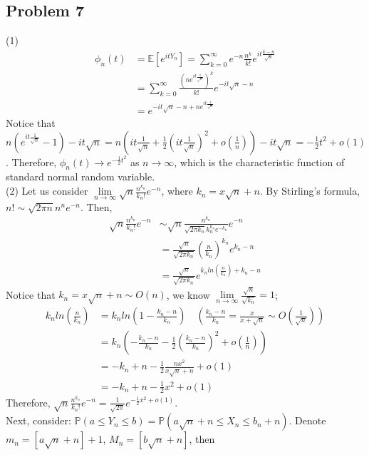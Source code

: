 \documentclass[12pt]{article}
\begin{document}
\subsection*{Problem 7}
(1)
\begin{align*}
\phi_{n}(t)&=\mathbb{E}[e^{itY_{n}}]=\sum_{k=0}^{\infty}e^{-n}\frac{n^k}{k!}e^{it\frac{k-n}{\sqrt{n}}}\\
&=\sum_{k=0}^{\infty}\frac{(ne^{it\frac{1}{\sqrt{n}}})^{k}}{k!}e^{-it\sqrt{n}-n}\\
&=e^{-it\sqrt{n}-n+ne^{it\frac{1}{\sqrt{n}}}}
\end{align*}
Notice that $n(e^{it\frac{1}{\sqrt{n}}}-1)-it\sqrt{n}=n(it\frac{1}{\sqrt{n}}+\frac{1}{2}(it\frac{1}{\sqrt{n}})^2+o(\frac{1}{n}))-it\sqrt{n}=-\frac{1}{2}t^2+o(1)$. Therefore, $\phi_{n}(t)\rightarrow e^{-\frac{1}{2}t^2}$ as $n\rightarrow\infty$, which is the characteristic function of standard normal random variable.\\
(2) Let us consider $\lim\limits_{n\rightarrow\infty}\sqrt{n}\frac{n^{k_{n}}}{k_{n}!}e^{-n}$, where $k_{n}=x\sqrt{n}+n$. By Stirling's formula, $n!\sim\sqrt{2\pi n}n^{n}e^{-n}$. Then,
\begin{align*}
\sqrt{n}\frac{n^{k_{n}}}{k_{n}!}e^{-n} &\sim \sqrt{n}\frac{n^{k_{n}}}{\sqrt{2\pi k_{n}}k_{n}^{k_{n}}e^{-k_{n}}} e^{-n}\\
&=\frac{\sqrt{n}}{\sqrt{2\pi k_{n}}}(\frac{n}{k_{n}})^{k_{n}}e^{k_{n}-n}\\
&=\frac{\sqrt{n}}{\sqrt{2\pi k_{n}}}e^{k_{n}ln(\frac{n}{k_{n}})+k_{n}-n}
\end{align*}
Notice that $k_{n}=x\sqrt{n}+n\sim O(n)$, we know $\lim\limits_{n\rightarrow\infty}\frac{\sqrt{n}}{\sqrt{k_{n}}}=1$;
\begin{align*}
k_{n}ln(\frac{n}{k_{n}})&=k_{n}ln(1-\frac{k_{n}-n}{k_{n}})\quad(\frac{k_{n}-n}{k_{n}}=\frac{x}{x+\sqrt{n}}\sim O(\frac{1}{\sqrt{n}}))\\
&=k_{n}(-\frac{k_{n}-n}{k_{n}}-\frac{1}{2}(\frac{k_{n}-n}{k_{n}})^{2}+o(\frac{1}{n}))\\
&=-k_{n}+n-\frac{1}{2}\frac{n x^2}{x\sqrt{n}+n}+o(1)\\
&=-k_{n}+n-\frac{1}{2}x^2+o(1)
\end{align*}
Therefore, $\sqrt{n}\frac{n^{k_{n}}}{k_{n}!}e^{-n}=\frac{1}{\sqrt{2\pi}}e^{-\frac{1}{2}x^2+o(1)}$.\\
Next, consider: $\mathbb{P}(a\leqslant Y_{n}\leqslant b)=\mathbb{P}(a\sqrt{n}+n\leqslant X_{n}\leqslant b_{n}+n)$. Denote $m_{n}=[a\sqrt{n}+n]+1$, $M_{n}=[b\sqrt{n}+n]$, then
\end{document}
